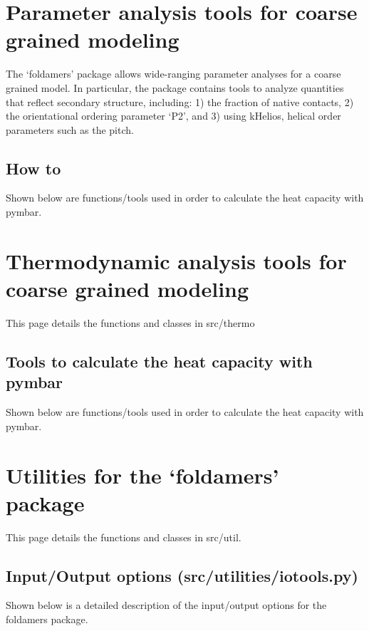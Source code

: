 \documentclass[letterpaper,12pt,english,openany,oneside]{sphinxmanual}
\begin{document}
\chapter{Parameter analysis tools for coarse grained modeling}
\label{\detokenize{parameters:parameter-analysis-tools-for-coarse-grained-modeling}}\label{\detokenize{parameters::doc}}
The ‘foldamers’ package allows wide-ranging parameter analyses for a coarse grained model.  In particular, the package contains tools to analyze quantities that reflect secondary structure, including: 1) the fraction of native contacts, 2) the orientational ordering parameter ‘P2’, and 3) using kHelios, helical order parameters such as the pitch.


\section{How to}
\label{\detokenize{parameters:how-to}}
Shown below are functions/tools used in order to calculate
the heat capacity with pymbar.


\chapter{Thermodynamic analysis tools for coarse grained modeling}
\label{\detokenize{thermo:thermodynamic-analysis-tools-for-coarse-grained-modeling}}\label{\detokenize{thermo::doc}}
This page details the functions and classes in src/thermo


\section{Tools to calculate the heat capacity with pymbar}
\label{\detokenize{thermo:tools-to-calculate-the-heat-capacity-with-pymbar}}
Shown below are functions/tools used in order to calculate
the heat capacity with pymbar.


\chapter{Utilities for the ‘foldamers’ package}
\label{\detokenize{utilities:utilities-for-the-foldamers-package}}\label{\detokenize{utilities::doc}}
This page details the functions and classes in src/util.


\section{Input/Output options (src/utilities/iotools.py)}
\label{\detokenize{utilities:input-output-options-src-utilities-iotools-py}}
Shown below is a detailed description of the input/output
options for the foldamers package.
\end{document}
